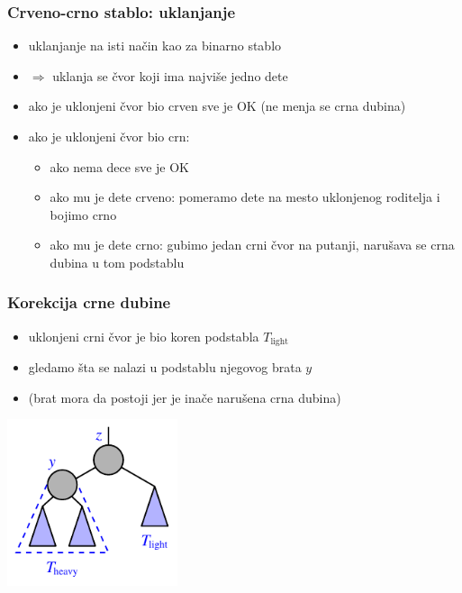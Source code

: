 \documentclass[compress]{beamer}
\begin{document}
\begin{frame}[fragile]
  \frametitle{Crveno-crno stablo: uklanjanje}
  \begin{itemize}
    \item uklanjanje na isti način kao za binarno stablo 
    \item $\Rightarrow$ uklanja se čvor koji ima najviše jedno dete
    \item ako je uklonjeni čvor bio crven sve je OK (ne menja se crna dubina)
    \item ako je uklonjeni čvor bio crn:
    \begin{itemize}
      \item ako nema dece sve je OK
      \item ako mu je dete crveno: pomeramo dete na mesto uklonjenog roditelja i bojimo crno
      \item ako mu je dete crno: gubimo jedan crni čvor na putanji, narušava se crna dubina u tom podstablu
    \end{itemize}
  \end{itemize}
\end{frame}

\begin{frame}[fragile]
  \frametitle{Korekcija crne dubine}
  \begin{itemize}
    \item uklonjeni crni čvor je bio koren podstabla $T_{\text{light}}$
    \item gledamo šta se nalazi u podstablu njegovog brata $y$ 
    \item (brat mora da postoji jer je inače narušena crna dubina)
  \end{itemize}
  \begin{center}
    \includegraphics[width=5cm]{asp-11-pic41.pdf}
  \end{center}
\end{frame}
\end{document}
